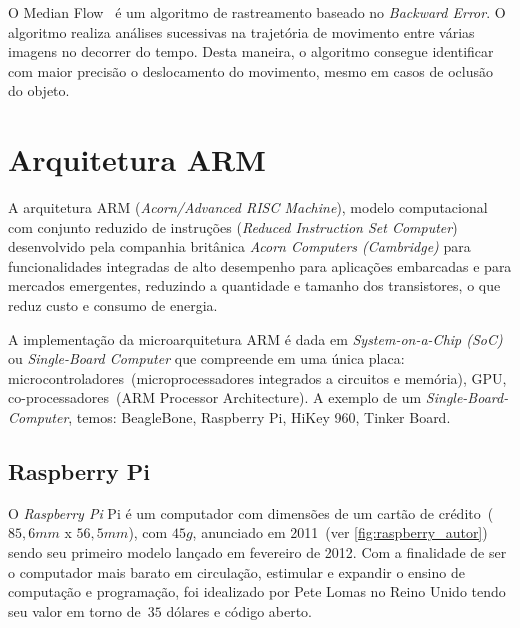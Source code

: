 \documentclass[12pt,oneside,a4paper,chapter=TITLE,section=TITLE,sumario=tradicional]{abntex2}
\begin{document}
O Median Flow~\cite{Kalal10forward} é um algoritmo de rastreamento baseado no \textit{Backward Error}. O algoritmo realiza análises sucessivas na trajetória de movimento entre várias imagens no decorrer do tempo. Desta maneira, o algoritmo consegue identificar com maior precisão o deslocamento do movimento, mesmo em casos de oclusão do objeto. 



\section{Arquitetura ARM}

A arquitetura ARM (\textit{Acorn/Advanced RISC Machine}), modelo computacional com conjunto reduzido de instruções (\textit{Reduced Instruction Set Computer}) desenvolvido pela companhia britânica \textit{Acorn Computers (Cambridge)} para funcionalidades integradas de alto desempenho para aplicações embarcadas e para mercados emergentes, reduzindo a quantidade e tamanho dos transistores, o que reduz custo e consumo de energia. 

A implementação da microarquitetura ARM é dada em \textit{System-on-a-Chip (SoC)} ou \textit{Single-Board Computer} que compreende em uma única placa: microcontroladores~(microprocessadores integrados a circuitos e memória), GPU, co-processadores~(ARM Processor Architecture).
A exemplo de um \textit{Single-Board-Computer}, temos: BeagleBone, Raspberry Pi, HiKey 960, Tinker Board.

\subsection{Raspberry Pi}
\label{sec:raspberry}

O \textit{Raspberry Pi} Pi é um computador com dimensões de um cartão de crédito~($85,6mm$ x $56,5mm$), com $45g$, anunciado em 2011~(ver \autoref{fig:raspberry_autor}) sendo seu primeiro modelo lançado em fevereiro de 2012. Com a finalidade de ser o computador mais barato em circulação, estimular e expandir o ensino de computação e programação, foi idealizado por Pete Lomas no Reino Unido tendo seu valor em torno de~$35$ dólares e código aberto.

\begin{figure}[htb]
    \fonteautor
\end{figure}
\end{document}
